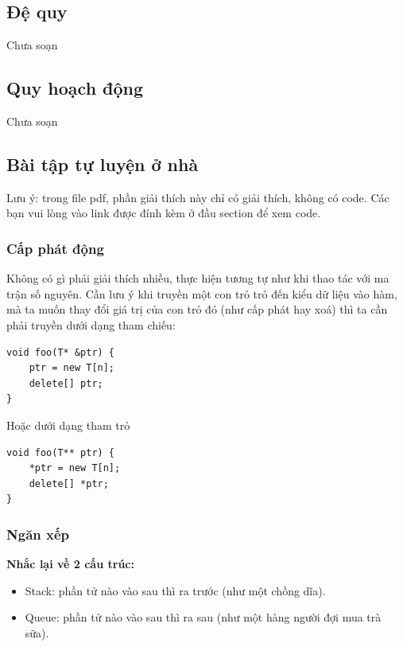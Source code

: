 \documentclass[main.tex]{subfiles}
\begin{document}

\subsection{Đệ quy}
Chưa soạn

\subsection{Quy hoạch động}
Chưa soạn


\subsection{Bài tập tự luyện ở nhà}
Lưu ý: trong file pdf, phần giải thích này chỉ có giải thích, không có code. Các bạn vui lòng vào link được đính kèm ở đầu section để xem code.
\subsubsection{Cấp phát động}
Không có gì phải giải thích nhiều, thực hiện tương tự như khi thao tác với ma trận số nguyên.
Cần lưu ý khi truyền một con trỏ trỏ đến kiểu dữ liệu  vào hàm, mà ta muốn thay đổi giá trị của con trỏ đó (như cấp phát hay xoá) thì ta cần phải truyền dưới dạng tham chiếu: 
\begin{verbatim}
void foo(T* &ptr) {
    ptr = new T[n];
    delete[] ptr;
}
\end{verbatim}
Hoặc dưới dạng tham trỏ
\begin{verbatim}
void foo(T** ptr) {
    *ptr = new T[n];
    delete[] *ptr;
}
\end{verbatim}

\subsubsection{Ngăn xếp}
\textbf{Nhắc lại về 2 cấu trúc:}
\begin{itemize}
    \item Stack: phần tử nào vào sau thì ra trước (như một chồng dĩa).
    \item Queue: phần tử nào vào sau thì ra sau (như một hàng người đợi mua trà sữa).
\end{itemize}
\end{document}
